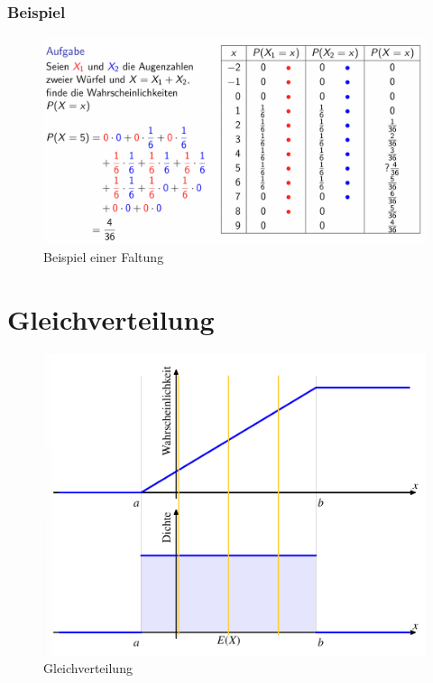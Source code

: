 \documentclass[../Main.tex]{subfiles}
\begin{document}
\subsubsection{Beispiel}

\begin{figure}[H]
    \centering
    \includegraphics[width=1\linewidth]{Images/faltung-beispiel.png}
    \caption{Beispiel einer Faltung}
\end{figure}


\newpage
\section{Gleichverteilung}

\begin{figure}[H]
    \centering
    \includegraphics[width=0.75\linewidth]{Images/gleichverteilung.png}
    \caption{Gleichverteilung}
\end{figure}
\end{document}
